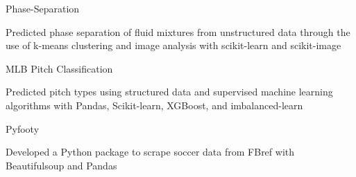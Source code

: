 
\begin{cventries}
  \cventry
    {} %
    {Phase-Separation} %
    {} %
    {} %
    {
      \begin{cvitems} %
        \item {Predicted phase separation of fluid mixtures from unstructured
            data through the use of
            k-means clustering and image analysis with scikit-learn and
              scikit-image}
      \end{cvitems}
    }

  \cventry
    {} %
    {MLB Pitch Classification} %
    {} %
    {} %
    {
      \begin{cvitems} %
      	\item {Predicted pitch types using
            structured data and supervised machine learning algorithms with Pandas,
              Scikit-learn, XGBoost, and
              imbalanced-learn}
      \end{cvitems}
    }

  \cventry
    {} %
    {Pyfooty} %
    {} %
    {} %
    {
      \begin{cvitems} %
      	\item {Developed a Python package to scrape soccer data
            from FBref with Beautifulsoup and Pandas}
      \end{cvitems}
    }
\end{cventries}
